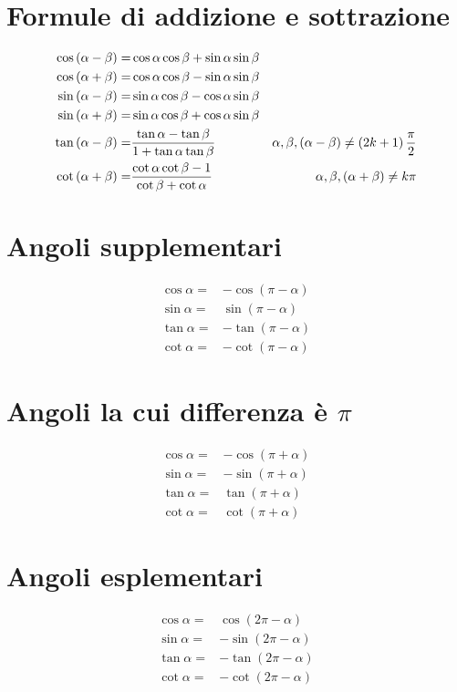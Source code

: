 \section{Formule di addizione e sottrazione}\label{sec:formule-di-addizione}
\begin{align*}
\cos\left(\alpha-\beta\right)=&{}\cos\alpha\cos\beta+\sin\alpha\sin\beta\\\index{Coseno!differenza!angoli}
\cos\left(\alpha+\beta\right)=&{}\cos\alpha\cos\beta-\sin\alpha\sin\beta\\\index{Coseno!somma!angoli}
\sin\left(\alpha-\beta\right)=&{}\sin\alpha\cos\beta-\cos\alpha\sin\beta\\\index{Seno!differenza angoli}
\sin\left(\alpha+\beta\right)=&{}\sin\alpha\cos\beta+\cos\alpha\sin\beta\\\index{Seno!somma!angoli}
\tan\left(\alpha-\beta\right)=&{}\dfrac{\tan\alpha-\tan\beta}{1+\tan\alpha\tan\beta} &\alpha,\beta,\left(\alpha-\beta\right)\neq\left(2k+1\right)\dfrac{\pi}{2}\\\index{Tangente!differenza!angoli}
\cot\left(\alpha+\beta\right)=&{}\dfrac{\cot\alpha\cot\beta-1}{\cot\beta+\cot\alpha}
&\alpha,\beta,\left(\alpha+\beta\right)\neq k\pi\index{Cotangente!somma!angoli}
\end{align*}
\section{Angoli supplementari}\label{sec:angoli-supplementari}
\begin{align*}
\cos\alpha=&-\cos(\pi-\alpha)\\
\sin\alpha=&\sin(\pi-\alpha)\\
\tan\alpha=&-\tan(\pi-\alpha)\\
\cot\alpha=&-\cot(\pi-\alpha)
\end{align*}
\section{Angoli la cui differenza è \texorpdfstring{$\pi$}{\textpi}}
\begin{align*}
\cos\alpha=&-\cos(\pi+\alpha)\\
\sin\alpha=&-\sin(\pi+\alpha)\\
\tan\alpha=&\tan(\pi+\alpha)\\
\cot\alpha=&\cot(\pi+\alpha)
\end{align*}
\section{Angoli esplementari}\label{sec:angoli-esplementari}
\begin{align*}
\cos\alpha=&\cos(2\pi-\alpha)\\
\sin\alpha=&-\sin(2\pi-\alpha)\\
\tan\alpha=&-\tan(2\pi-\alpha)\\
\cot\alpha=&-\cot(2\pi-\alpha)
\end{align*}

